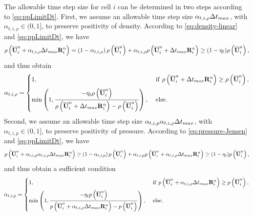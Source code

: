 The allowable time step size for cell $i$ can be determined in two steps according to \eqref{eq:ppLimitDt}. First, we assume an allowable time step size $\alpha_{t,i,\rho} \mathrm\Delta t_{max}$, with $\alpha_{t,i,\rho} \in (0,1]$, to preserve positivity of density. According to \eqref{eq:density-linear} and \eqref{eq:ppLimitDt}, we have
\begin{equation}
    \rho\left(\overline{\mathbf{U}}^n_i + \alpha_{t,i,\rho} \mathrm\Delta t_{max} \mathbf{R}^n_i\right)= \left(1- \alpha_{t,i,\rho}\right)\rho\left(\overline{\mathbf{U}}^n_i\right) + \alpha_{t,i,\rho} \rho\left(\overline{\mathbf{U}}^n_i + \mathrm\Delta t_{max} \mathbf{R}^n_i\right)  \geq
    (1- \eta_t)
    \rho\left(\overline{\mathbf{U}}_i^n\right),
\end{equation}
and thus obtain
\begin{equation}
    \alpha_{t,i,\rho} = \begin{dcases}
        1,                                                                                                                                         & \ \mathrm{if} \ \rho\left(\overline{\mathbf{U}}^n_i + \mathrm\Delta t_{max} \mathbf{R}^n_i\right) \geq  \rho\left(\overline{\mathbf{U}}^n_i\right), \\
        \min\left(1, \dfrac{-\eta_t \rho\left(\overline{\mathbf{U}}^n_i\right)}{\rho \left(\overline{\mathbf{U}}^n_i + \mathrm\Delta t_{max} \mathbf{R}^n_i\right)-  \rho\left(\overline{\mathbf{U}}^n_i\right)} \right), & \
        \mathrm{else}.
    \end{dcases}
\end{equation}
Second, we assume an allowable time step size $\alpha_{t,i,p}  \alpha_{t,i,\rho} \mathrm\Delta t_{max}$, with $\alpha_{t,i,p} \in (0,1]$, to preserve positivity of pressure. According to \eqref{eq:pressure-Jensen} and \eqref{eq:ppLimitDt}, we have
\begin{equation}
    p\left(\overline{\mathbf{U}}^n_i +  \alpha_{t,i,p} \alpha_{t,i,\rho} \mathrm\Delta t_{max} \mathbf{R}^n_i\right) \geq \left(1-\alpha_{t,i,p}\right)p\left(\overline{\mathbf{U}}^n_i\right) + \alpha_{t,i,p} p\left(\overline{\mathbf{U}}^n_i + \alpha_{t,i,\rho} \mathrm\Delta t_{max} \mathbf{R}^n_i\right) \geq
    (1- \eta_t)
    p\left(\overline{\mathbf{U}}_i^n\right),
\end{equation}
and thus obtain a sufficient condition
\begin{equation}
    \alpha_{t,i,p} = \begin{dcases}
        1,                                                                                                                                                     & \ \mathrm{if} \ p \left(\UM^n_i + \alpha_{t,i,\rho} \inc t_{max} \R^n_i\right) \geq  p \left(\UM^n_i\right), \\
        \min\left(1, \dfrac{-\eta_t p \left(\UM^n_i\right)}{p \left(\UM^n_i +  \alpha_{t,i,\rho} \inc t_{max} \R^n_i\right)-  p \left(\UM^n_i\right)} \right), & \                                                                                                            %
        \mathrm{else}.
    \end{dcases}
\end{equation}
